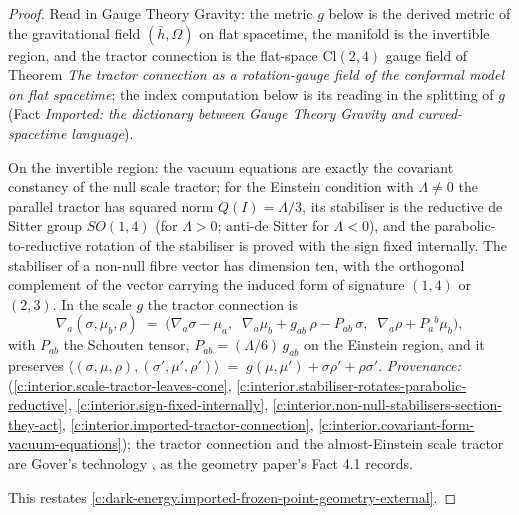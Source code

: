 \documentclass[11pt]{article}
\theoremstyle{definition}
\theoremstyle{plain}
\providecommand{\Cl}{}\renewcommand{\Cl}{\mathrm{Cl}}
\providecommand{\hb}{}\renewcommand{\hb}{\bar{h}}
\providecommand{\ip}{}\renewcommand{\ip}[2]{\langle #1, #2\rangle}
\begin{document}
\begin{proof}
Read in Gauge Theory Gravity: the metric $g$ below is the derived metric of the gravitational field $(\hb, \Omega)$ on flat spacetime, the manifold is the invertible region, and the tractor connection is the flat-space $\Cl(2,4)$ gauge field of Theorem \emph{The tractor connection as a rotation-gauge field of the conformal model on flat spacetime}; the index computation below is its reading in the splitting of $g$ (Fact \emph{Imported: the dictionary between Gauge Theory Gravity and curved-spacetime language}).

On the invertible region: the vacuum equations are exactly the covariant constancy of the null scale tractor; for the Einstein condition with $\Lambda \neq 0$ the parallel tractor has squared norm $Q(I) = \Lambda/3$, its stabiliser is the reductive de Sitter group $SO(1,4)$ (for $\Lambda > 0$; anti-de Sitter for $\Lambda < 0$), and the parabolic-to-reductive rotation of the stabiliser is proved with the sign fixed internally. The stabiliser of a non-null fibre vector has dimension ten, with the orthogonal complement of the vector carrying the induced form of signature $(1,4)$ or $(2,3)$. In the scale $g$ the tractor connection is
\begin{equation}
\nabla_a(\sigma, \mu_b, \rho) \;=\; \bigl(\nabla_a\sigma - \mu_a,\;\; \nabla_a\mu_b + g_{ab}\,\rho - P_{ab}\,\sigma,\;\; \nabla_a\rho + P_a{}^{b}\mu_b\bigr),
\end{equation}
with $P_{ab}$ the Schouten tensor, $P_{ab} = (\Lambda/6)\,g_{ab}$ on the Einstein region, and it preserves $\ip{(\sigma,\mu,\rho)}{(\sigma',\mu',\rho')} \;=\; g(\mu,\mu') + \sigma\rho' + \rho\sigma'$. \emph{Provenance:} \cite[Fact~4.1, Thms.~4.5, 4.7, Props.~4.4, 4.10, Lem.~4.8]{ButlerT6} (\ref{c:interior.scale-tractor-leaves-cone}, \ref{c:interior.stabiliser-rotates-parabolic-reductive}, \ref{c:interior.sign-fixed-internally}, \ref{c:interior.non-null-stabilisers-section-they-act}, \ref{c:interior.imported-tractor-connection}, \ref{c:interior.covariant-form-vacuum-equations}); the tractor connection and the almost-Einstein scale tractor are Gover's technology \cite{Gover2010}, as the geometry paper's Fact 4.1 records.

This restates \ref{c:dark-energy.imported-frozen-point-geometry-external}.

\end{proof}
\end{document}
